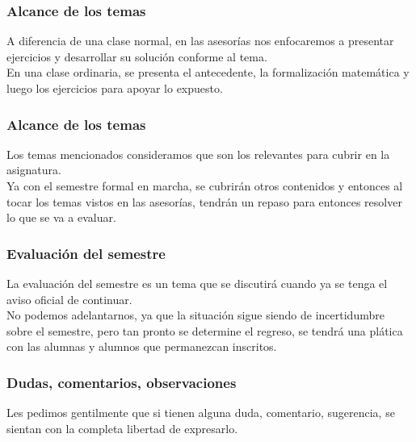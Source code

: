 \begin{frame}
\frametitle{Alcance de los temas}
A diferencia de una clase normal, en las asesorías nos enfocaremos a presentar ejercicios y desarrollar su solución conforme al tema.
\\
\bigskip
\pause
En una clase ordinaria, se presenta el antecedente, la formalización matemática y luego los ejercicios para apoyar lo expuesto.
\end{frame}
\begin{frame}
\frametitle{Alcance de los temas}
Los temas mencionados consideramos que son los relevantes para cubrir en la asignatura.
\\
\bigskip
\pause
Ya con el semestre formal en marcha, se cubrirán otros contenidos y entonces al tocar los temas vistos en las asesorías, tendrán un repaso para entonces resolver lo que se va a evaluar.
\end{frame}
\begin{frame}
\frametitle{Evaluación del semestre}
La evaluación del semestre es un tema que se discutirá cuando ya se tenga el aviso oficial de continuar.
\\
\bigskip
\pause
No podemos adelantarnos, ya que la situación sigue siendo de incertidumbre sobre el semestre, pero tan pronto se determine el regreso, se tendrá una plática con las alumnas y alumnos que permanezcan inscritos.
\end{frame}
\begin{frame}
\frametitle{Dudas, comentarios, observaciones}
Les pedimos gentilmente que si tienen alguna duda, comentario, sugerencia, se sientan con la completa libertad de expresarlo.
\end{frame}


